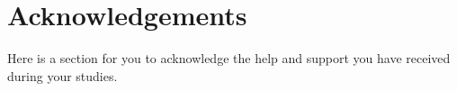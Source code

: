 
\chapter*{Acknowledgements} 

Here is a section for you to acknowledge the help and support you have received during your studies.
\blindtext
